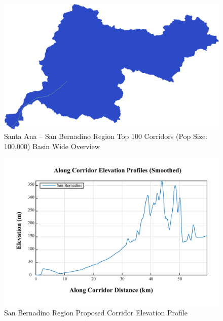         \begin{figure}[!h]
            \begin{center}
            \includegraphics[width=5.5in]{figures/SanBernadino_PathwayLarge.png}   
            \caption{Santa Ana -- San Bernadino Region Top 100 Corridors (Pop Size: 100,000) Basin Wide Overview}
            \label{fig:SASBsolutionOverview}
            \end{center}
        \end{figure}
        
        \begin{figure}[!h]
            \begin{center}
            \includegraphics[width=5.5in]{figures/SanBernadino_Elevation_Profile.png}   
            \caption{San Bernadino Region Proposed Corridor Elevation Profile}
            \label{fig:SASBelevationProfile}
            \end{center}
        \end{figure}
    
